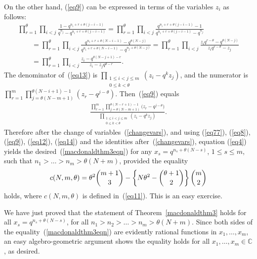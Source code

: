 \documentclass[pdftex]{sigma}
\numberwithin{equation}{section}
\newcommand{\C}{\mathbb{C}}
\begin{document}
On the other hand, (\ref{eq9}) can be expressed in terms of the variables $z_i$ as follows:
\begin{gather}
\prod_{r = 1}^{\theta}{ \prod_{i < j}{ \frac{1 - q^{n_i + r + \theta(j-i-1)}}{q^{n_j} - q^{n_i + r + \theta(j-i-1)}} } } = \prod_{r = 1}^{\theta}{ \prod_{i < j}{ \frac{q^{n_i + r + \theta(j-i-1)} - 1}{ q^{n_i + r + \theta(j-i-1)} - q^{n_j}} } }\nonumber\\
\qquad{} = \prod_{r = 1}^{\theta}{ \prod_{i < j}{ \frac{q^{n_i + r + \theta(N- i -1)} - q^{\theta(N-j)}}{ q^{n_i + r + \theta(N- i -1)} - q^{n_j + \theta(N - j)}} } } = \prod_{r = 1}^{\theta}{ \prod_{i < j}{ \frac{z_i q^{r - \theta} - q^{\theta(N-j)}}{ z_i q^{ r - \theta} - z_j} } }\nonumber\\
 \qquad{} = \prod_{r = 1}^{\theta}{ \prod_{i < j}{ \frac{z_i - q^{\theta(N - j + 1) - r}}{ z_i - z_j q^{\theta - r}} } }.\label{eq13}
\end{gather}
The denominator of~(\ref{eq13}) is $\prod\limits_{\substack{ 1\leq i < j\leq m \\ 0\leq k < \theta}}{(z_i - q^k z_j)}$, and the numerator is $\prod\limits_{r=1}^m{ \prod\limits_{j=\theta(N - m + 1)}^{\theta(N-i+1)-1}{ (z_r - q^{j-\theta}) } }$. Then~(\ref{eq9}) equals
\begin{gather}\label{eq14}
\frac{\prod\limits_{r=1}^m{ \prod\limits_{j=\theta(N - m+1)}^{\theta(N-r+1)-1}{ \big(z_r - q^{j-\theta}\big) } }}{\prod\limits_{\substack{ 1\leq i < j\leq m \\ 0\leq k < \theta}}{(z_i - q^k z_j)}}.
\end{gather}
Therefore after the change of variables~(\ref{changevars}), and using (\ref{eq77}), (\ref{eq8}), (\ref{eq9}), (\ref{eq12}), (\ref{eq14}) and the identities after~(\ref{changevars}), equation (\ref{eq4}) yields the desired~(\ref{macdonaldthm3eqn}) for any $x_s = q^{n_s + \theta(N - s)}$, $1\leq s\leq m$, such that $n_1 > \dots > n_m > \theta (N + m)$, provided the equality{\samepage
\begin{gather*}
c(N, m, \theta) = \theta^2 \dbinom{m+1}{3} - \left\{ N\theta^2 - \dbinom{\theta + 1}{2} \right\}\dbinom{m}{2}
\end{gather*}
holds, where $c(N, m, \theta)$ is def\/ined in~(\ref{eq11}). This is an easy exercise.}

We have just proved that the statement of Theorem~\ref{macdonaldthm3} holds for all $x_s = q^{n_s + \theta(N - s)}$, for all $n_1 > n_2 > \dots > n_m > \theta (N + m)$. Since both sides of the equality~(\ref{macdonaldthm3eqn}) are evidently rational functions in $x_1, \dots, x_m$, an easy algebro-geometric argument shows the equality holds for all $x_1, \dots, x_m\in\C$, as desired.
\end{document}
